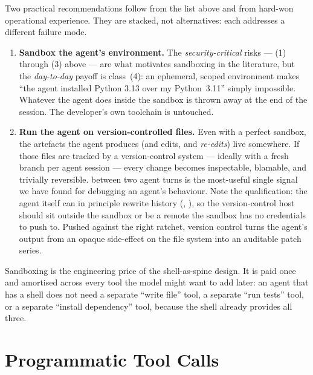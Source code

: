 \noindent
Two practical recommendations follow from the list above and from
hard-won operational experience. They are stacked, not alternatives:
each addresses a different failure mode.

\begin{enumerate}[label=\textbf{(\arabic*)},leftmargin=2.2em,itemsep=0.4em]

\item \textbf{Sandbox the agent's environment.} The
  \emph{security-critical} risks --- (1) through (3) above --- are
  what motivates sandboxing in the literature, but the
  \emph{day-to-day} payoff is class~(4): an ephemeral, scoped
  environment makes ``the agent installed Python 3.13 over my
  Python~3.11'' simply impossible. Whatever the agent does inside
  the sandbox is thrown away at the end of the session. The
  developer's own toolchain is untouched.

\item \textbf{Run the agent on version-controlled files.} Even with
  a perfect sandbox, the artefacts the agent produces (and edits,
  and \emph{re-edits}) live somewhere. If those files are tracked by
  a version-control system --- ideally with a fresh branch per agent
  session --- every change becomes inspectable, blamable, and
  trivially reversible.  between two agent turns is
  the most-useful single signal we have found for debugging an
  agent's behaviour. Note the qualification: the agent itself can in
  principle rewrite history (,
  ), so the version-control host should sit
  outside the sandbox or be a remote the sandbox has no credentials
  to push to. Pushed against the right ratchet, version control
  turns the agent's output from an opaque side-effect on the file
  system into an auditable patch series.

\end{enumerate}

\noindent
Sandboxing is the engineering price of the shell-as-spine design. It
is paid once and amortised across every tool the model might want to
add later: an agent that has a shell does not need a separate
``write file'' tool, a separate ``run tests'' tool, or a separate
``install dependency'' tool, because the shell already provides all
three.

\section{Programmatic Tool Calls}
\label{sec:codeact}

